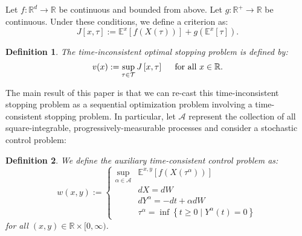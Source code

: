 \documentclass[11pt]{article}
\newtheorem{defn}{Definition}
\begin{document}
Let $f:\mathbb{R}^d\to\mathbb{R}$ be continuous and bounded from above. Let $g:\mathbb{R}^+\to\mathbb{R}$ be continuous. Under these conditions, we define a criterion as:
\begin{equation}
J\left[x,\tau\right] := \mathbb{E}^x\left[ f(X(\tau))\right] + g\left(\mathbb{E}^x\left[\tau\right]\right).
\end{equation}

\begin{defn}\label{Defn:MainProblem}The time-inconsistent optimal stopping problem is defined by:
\begin{equation}v(x) := \sup\limits_{\tau\in\mathcal{T}} J\left[x,\tau\right]\hspace{0.5cm}\text{for all }x\in\mathbb{R}.\end{equation}\end{defn}

The main result of this paper is that we can re-cast this time-inconsistent stopping problem as a sequential optimization problem involving a time-consistent stopping problem. In particular, let $\mathcal{A}$ represent the collection of all square-integrable, progressively-measurable processes and consider a stochastic control problem:
\begin{defn}\label{Defn:AuxProblem}We define the auxiliary time-consistent control problem as:
\begin{equation}w(x,y):=\left\{\begin{array}{rl}
\sup\limits_{\alpha\in\mathcal{A}}&\mathbb{E}^{x,y}\left[f(X(\tau^\alpha))\right]\\
& dX = dW\\
& dY^\alpha = -dt + \alpha dW\\
& \tau^\alpha = \inf\left\{t\geq 0\mid Y^\alpha(t)=0\right\}
\end{array}\right.\end{equation}
for all $(x,y)\in\mathbb{R}\times [0,\infty)$.\end{defn}
\end{document}
